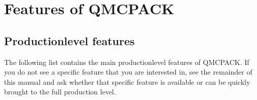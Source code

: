 \documentclass[letterpaper,10pt,english]{sphinxmanual}
\begin{document}
\chapter{Features of QMCPACK}
\label{\detokenize{features:features-of-qmcpack}}\label{\detokenize{features:chap-features}}\label{\detokenize{features::doc}}

\section{Production\sphinxhyphen{}level features}
\label{\detokenize{features:production-level-features}}
The following list contains the main production\sphinxhyphen{}level features of
QMCPACK. If you do not see a specific feature that you are interested
in, see the remainder of this manual and ask whether that specific
feature is available or can be quickly brought to the full production
level.
\end{document}
